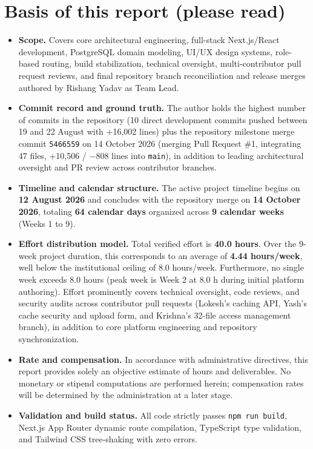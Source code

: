 \documentclass[11pt,a4paper]{article}
\begin{document}
\section*{Basis of this report (please read)}
\begin{itemize}[leftmargin=1.4em, itemsep=2pt]
\item \textbf{Scope.} Covers core architectural engineering, full-stack Next.js/React development, PostgreSQL domain modeling, UI/UX design systems, role-based routing, build stabilization, technical oversight, multi-contributor pull request reviews, and final repository branch reconciliation and release merges authored by Rishang Yadav as Team Lead.
\item \textbf{Commit record and ground truth.} The author holds the highest number of commits in the repository (10 direct development commits pushed between 19 and 22 August with +16,002 lines) plus the repository milestone merge commit \texttt{5466559} on 14 October 2026 (merging Pull Request \#1, integrating 47 files, +10,506 / $-$808 lines into \texttt{main}), in addition to leading architectural oversight and PR review across contributor branches.
\item \textbf{Timeline and calendar structure.} The active project timeline begins on \textbf{12 August 2026} and concludes with the repository merge on \textbf{14 October 2026}, totaling \textbf{64 calendar days} organized across \textbf{9 calendar weeks} (Weeks 1 to 9).
\item \textbf{Effort distribution model.} Total verified effort is \textbf{40.0 hours}. Over the 9-week project duration, this corresponds to an average of \textbf{4.44 hours/week}, well below the institutional ceiling of 8.0 hours/week. Furthermore, no single week exceeds 8.0 hours (peak week is Week 2 at 8.0 h during initial platform authoring). Effort prominently covers technical oversight, code reviews, and security audits across contributor pull requests (Lokesh's caching API, Yash's cache security and upload form, and Krishna's 32-file access management branch), in addition to core platform engineering and repository synchronization.
\item \textbf{Rate and compensation.} In accordance with administrative directives, this report provides solely an objective estimate of hours and deliverables. No monetary or stipend computations are performed herein; compensation rates will be determined by the administration at a later stage.
\item \textbf{Validation and build status.} All code strictly passes \texttt{npm run build}, Next.js App Router dynamic route compilation, TypeScript type validation, and Tailwind CSS tree-shaking with zero errors.
\end{itemize}
\end{document}
